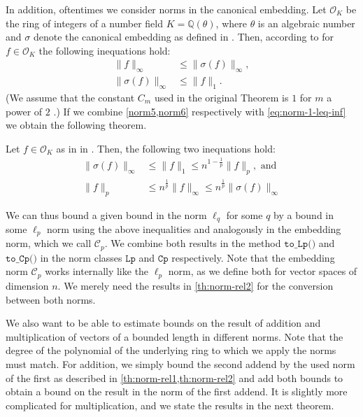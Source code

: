 In addition, oftentimes we consider norms in the canonical embedding. Let $\mathcal{O}_K$ be the ring of integers of a number field $K=\mathbb{Q}(\theta)$, where $\theta$ is an algebraic number and $\sigma$ denote the canonical embedding as defined in \cite{DPSZ12}. Then, according to \cite[Theorem~7]{DPSZ12} for $f \in \mathcal{O}_K$  the following inequations hold: %
\begin{align}
    \| f \|_\infty         & \leq \| \sigma(f) \|_\infty \label{norm5}, \\
    \| \sigma(f) \|_\infty & \leq \| f \|_1 \label{norm6}.
\end{align}
(We assume that the constant $C_m$ used in the original Theorem is $1$ for $m$ a power of $2$ \cite[Lemma~3]{DPSZ12}.) If we combine \cref{norm5,norm6} respectively with \cref{eq:norm-1-leq-inf} we obtain the following theorem.
\begin{theorem}\label{th:norm-rel2}
    Let $f \in \mathcal{O}_K$ as in in \cite{DPSZ12}. Then, the following two inequations hold:
    \begin{align}
        \| \sigma(f) \|_\infty & \leq \| f \|_1 \leq n^{1 - \frac{1}{p}} \| f \|_p, \text{ and } \label{eq:Coo-norm}             \\
        \| f \|_p              & \leq  n^{\frac{1}{p}} \| f \|_\infty \leq n^{\frac{1}{p}}  \| \sigma(f) \|_\infty \label{norm7}
    \end{align}
\end{theorem}
We can thus bound a given bound in the norm $\ell_q$ for some $q$ by a bound in some $\ell_p$ norm using the above inequalities and analogously in the embedding norm, which we call $\mathcal{C}_p$. We combine both results in the method $\texttt{to\_Lp()}$ and $\texttt{to\_Cp()}$ in the norm classes $\texttt{Lp}$ and $\texttt{Cp}$ respectively. Note that the embedding norm $\mathcal{C}_p$ works internally like the $\ell_p$ norm, as we define both for vector spaces of dimension $n$. We merely need the results in \cref{th:norm-rel2} for the conversion between both norms.

We also want to be able to estimate bounds on the result of addition and multiplication of vectors of a bounded length in different norms. Note that the degree of the polynomial of the underlying ring to which we apply the norms must match. For addition, we simply bound the second addend by the used norm of the first as described in \cref{th:norm-rel1,th:norm-rel2} and add both bounds to obtain a bound on the result in the norm of the first addend. It is slightly more complicated for multiplication, and we state the results in the next theorem.

